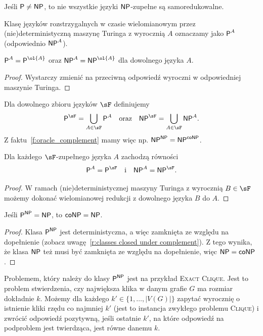 \begin{theorem}
    Jeśli $\textsf{P} \neq \textsf{NP}$, to nie wszystkie języki $\textsf{NP}$-zupełne są samoredukowalne.
\end{theorem}

Klasę języków rozstrzygalnych w czasie wielomianowym przez (nie)deterministyczną maszynę Turinga z wyrocznią $A$ oznaczamy jako $\textsf{P}^A$ (odpowiednio $\textsf{NP}^A$).

\begin{fact}\label{f:oracle_complement}
    $\Pclass^A = \Pclass^{\ol{A}}$ oraz $\NPclass^A = \NPclass^{\ol{A}}$ dla dowolnego języka $A$.
\end{fact}
\begin{proof}
    Wystarczy zmienić na przeciwną odpowiedź wyroczni w odpowiedniej maszynie Turinga.
\end{proof}

Dla dowolnego zbioru języków $\sF$ definiujemy
\[ \Pclass^\sF = \bigcup_{A\in\sF} \Pclass^A \quad \text{oraz} \quad \NPclass^\sF = \bigcup_{A\in\sF} \NPclass^A. \]
Z faktu~\ref{f:oracle_complement} mamy więc np. $\textsf{NP}^{\textsf{NP}} = \textsf{NP}^{\textsf{coNP}}$.

\begin{fact}
    Dla każdego $\sF$-zupełnego języka $A$ zachodzą równości
    \[ \Pclass^A = \Pclass^\sF \quad\text{i}\quad \NPclass^A = \NPclass^\sF. \]
\end{fact}
\begin{proof}
    W ramach (nie)deterministycznej maszyny Turinga z wyrocznią $B \in \sF$ możemy dokonać wielomianowej redukcji z dowolnego języka $B$ do $A$.
\end{proof}

\begin{fact}
    Jeśli $\textsf{P}^{\textsf{NP}} = \textsf{NP}$, to $\textsf{coNP} = \textsf{NP}$.
\end{fact}
\begin{proof}
    Klasa $\textsf{P}^{\textsf{NP}}$ jest deterministyczna, a więc zamknięta ze względu na dopełnienie (zobacz uwagę~\ref{r:classes closed under complement}). Z tego wynika, że klasa $\textsf{NP}$ też musi być zamknięta ze względu na dopełnienie, więc $\textsf{NP} = \textsf{coNP}$.
\end{proof}

Problemem, który należy do klasy $\textsf{P}^{\textsf{NP}}$ jest na przykład \textsc{Exact Clique}. Jest to problem stwierdzenia, czy największa klika w danym grafie $G$ ma rozmiar dokładnie $k$. Możemy dla każdego $k' \in \{1, \ldots, |V(G)|\}$ zapytać wyrocznię o istnienie kliki rzędu co najmniej $k'$ (jest to instancja zwykłego problemu \textsc{Clique}) i zwrócić odpowiedź pozytywną, jeśli ostatnie $k'$, na które odpowiedź na podproblem jest twierdząca, jest równe danemu $k$.

